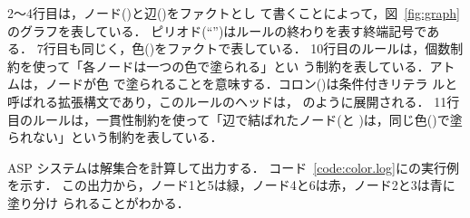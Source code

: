 2〜4行目は，ノード()と辺()をファクトとし
て書くことによって，図~\ref{fig:graph}のグラフを表している．
ピリオド(``'')はルールの終わりを表す終端記号である．
7行目も同じく，色()をファクトで表している．
%
10行目のルールは，個数制約を使って「各ノードは一つの色で塗られる」とい
う制約を表している．アトムは，ノードが色
で塗られることを意味する．コロン(\code{:})は条件付きリテラ
ルと呼ばれる拡張構文であり，このルールのヘッドは，
のように展開される．
11行目のルールは，一貫性制約を使って「辺で結ばれたノード(と
)は，同じ色()で塗られない」という制約を表している．

ASP システムは解集合を計算して出力する．
コード~\ref{code:color.log}に{\clingo}の実行例を示す．
この出力から，ノード1と5は緑，ノード4と6は赤，ノード2と3は青に塗り分け
られることがわかる．

